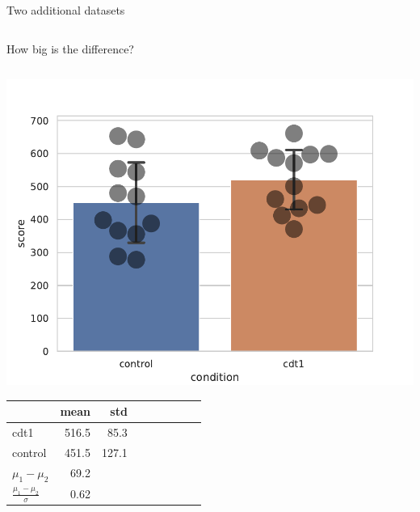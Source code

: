\documentclass[compress]{beamer}
\begin{document}
\begin{frame}{Two additional datasets}
\begin{columns}
\begin{column}{0.45\linewidth}
        \end{column}
    \end{columns}

\end{frame}


\begin{frame}{How big is the difference?}


    \begin{columns}
        \begin{column}{0.33\linewidth}

            \includegraphics[width=\columnwidth]{code/dataset2.pdf}

            \begin{center}
                \tiny
                \begin{tabular}{lrrrrrrrr}
                    \toprule
                    {} &  mean &         std\\ \midrule
                    cdt1      &   516.5 & 85.3 \\
                    control   &   451.5 & 127.1\\ \midrule
                    $\mu_1 - \mu_2$ & 69.2 & \only<5->{\\
                    $\frac{\mu_1 - \mu_2}{\sigma}$ & 0.62 &} \\
                    \bottomrule
                \end{tabular}
            \end{center}


\end{column}
\end{columns}
\end{frame}
\end{document}
